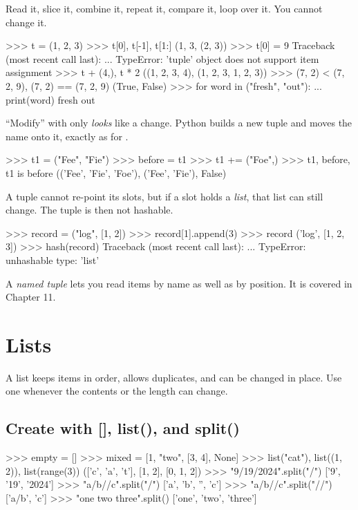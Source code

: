 Read it, slice it, combine it, repeat it, compare it, loop over it. You cannot change it.

\begin{pycode}
>>> t = (1, 2, 3)
>>> t[0], t[-1], t[1:]
(1, 3, (2, 3))
>>> t[0] = 9
Traceback (most recent call last):
  ...
TypeError: 'tuple' object does not support item assignment
>>> t + (4,), t * 2
((1, 2, 3, 4), (1, 2, 3, 1, 2, 3))
>>> (7, 2) < (7, 2, 9), (7, 2) == (7, 2, 9)
(True, False)
>>> for word in ("fresh", "out"):
...     print(word)
fresh
out
\end{pycode}

``Modify'' with \code{+=} only \emph{looks} like a change. Python builds a new tuple and moves the name onto
it, exactly as for .

\begin{pycode}
>>> t1 = ("Fee", "Fie")
>>> before = t1
>>> t1 += ("Foe",)
>>> t1, before, t1 is before
(('Fee', 'Fie', 'Foe'), ('Fee', 'Fie'), False)
\end{pycode}

\begin{trap}
A tuple cannot re-point its slots, but if a slot holds a \emph{list}, that list can still change. The
tuple is then not hashable.
\end{trap}

\begin{pycode}
>>> record = ("log", [1, 2])
>>> record[1].append(3)
>>> record
('log', [1, 2, 3])
>>> hash(record)
Traceback (most recent call last):
  ...
TypeError: unhashable type: 'list'
\end{pycode}

A \emph{named tuple} lets you read items by name as well as by position. It is covered in Chapter 11.

\section{Lists}

A list keeps items in order, allows duplicates, and can be changed in place. Use one whenever the contents
or the length can change.

\subsection{Create with [], list(), and split()}

\begin{pycode}
>>> empty = []
>>> mixed = [1, "two", [3, 4], None]
>>> list("cat"), list((1, 2)), list(range(3))
(['c', 'a', 't'], [1, 2], [0, 1, 2])
>>> "9/19/2024".split("/")
['9', '19', '2024']
>>> "a/b//c".split("/")
['a', 'b', '', 'c']
>>> "a/b//c".split("//")
['a/b', 'c']
>>> "one  two   three".split()
['one', 'two', 'three']
\end{pycode}

